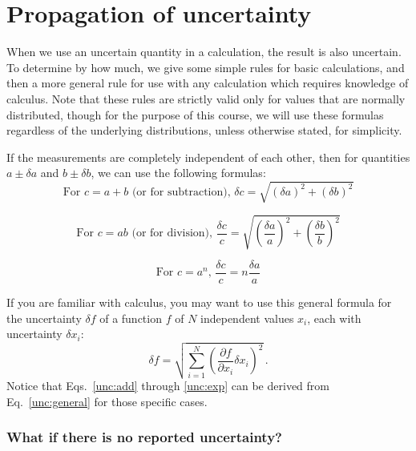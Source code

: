 \section{Propagation of uncertainty}\label{unc:sec:prop}

When we use an uncertain quantity in a calculation, the result is also uncertain. To determine by how much, we give some simple rules for basic calculations, and then a more general rule for use with any calculation which requires knowledge of calculus. Note that these rules are strictly valid only for values that are normally distributed, though for the purpose of this course, we will use these formulas regardless of the underlying distributions, unless otherwise stated, for simplicity.

If the measurements are completely independent of each other, then for quantities $a \pm \delta a$ and $b \pm \delta b$, we can use the following formulas:
\begin{equation}\label{unc:add}
\textrm{For } c = a + b \textrm{ (or for subtraction), } \delta c = \sqrt{(\delta a)^2 + (\delta b)^2}
\end{equation}

\begin{equation}\label{unc:mult}
\textrm{For } c = ab \textrm{ (or for division), } \frac{\delta c}{c} = \sqrt{\left(\frac{\delta a}{a}\right)^2 + \left(\frac{\delta b}{b}\right)^2}
\end{equation}

\begin{equation}\label{unc:exp}
\textrm{For } c = a^n,\, \frac{\delta c}{c} = n \frac{\delta a}{a}
\end{equation}

If you are familiar with calculus, you may want to use this general formula for the uncertainty $\delta f$ of a function $f$ of $N$ independent values $x_i$, each with uncertainty $\delta x_i$:
\begin{equation}\label{unc:general}
\delta f = \sqrt{ \sum_{i=1}^{N} \left(\frac{\partial f}{\partial x_i} \delta x_i\right)^2 } \, .
\end{equation}
Notice that Eqs.\ \ref{unc:add} through \ref{unc:exp} can be derived from Eq.\ \ref{unc:general} for those specific cases.

\subsubsection{What if there is no reported uncertainty?}

